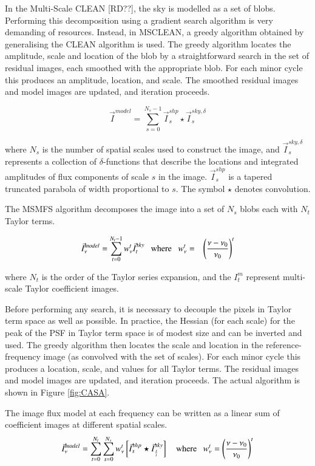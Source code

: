 \documentclass[11pt,a4paper]{article}
\begin{document}
In the Multi-Scale CLEAN [RD??], the sky is modelled as a set of blobs. Performing this decomposition using a gradient search algorithm is very demanding of resources. Instead, in MSCLEAN, a greedy algorithm obtained by generalising the CLEAN algorithm is used. The greedy algorithm locates the amplitude, scale and location of the blob by a straightforward search in the set of residual images, each smoothed with the appropriate blob. For each minor cycle this produces an amplitude, location, and scale. The smoothed residual images and model images are updated, and iteration proceeds.

\begin{equation}
\vec{I}^{model} = \sum_{s=0}^{N_s-1}  \vec{I}^{shp}_{s} \star \vec{I}^{sky,\delta}_s
\label{Eq:ms_model}
\end{equation}

where $N_s$ is the number of spatial scales used to construct the image, and
$\vec{I}^{sky,\delta}_{s}$ represents a collection of $\delta$-functions that describe the locations
and integrated amplitudes of flux components of scale $s$ in the image. $\vec{I}^{shp}_s$ is a tapered truncated parabola of width proportional to $s$.
The symbol $\star$ denotes convolution. 

The MSMFS algorithm decomposes the image into a set of $N_s$ blobs each with $N_t$ Taylor terms. 

\begin{eqnarray}
\label{eqn:mf_model}
\vec{I}^{model}_{\nu} = \sum_{t=0}^{N_t-1} {w_{\nu}^t} \vec{I}^{sky}_{t} ~~~\mathrm{where}~~~ {w_{\nu}^t}&=&{\left(\frac{\nu-\nu_0}{\nu_0}\right)}^t 
\end{eqnarray}

where $N_t$ is the order of the Taylor series expansion, and 
the $I^m_t$ represent multi-scale Taylor coefficient images.

Before performing any search, it is necessary to decouple the pixels in Taylor term space as well as possible. In practice, the Hessian (for each scale) for the peak of the PSF in Taylor term space is of modest size and can be inverted and used. The greedy algorithm then locates the scale and location in the reference-frequency image (as convolved with the set of scales). For each minor cycle this produces a location, scale, and values for all Taylor terms. The residual images and model images are updated, and iteration proceeds. The actual algorithm is shown in Figure \ref{fig:CASA}.


The image flux model at each frequency can be written as a linear sum of  
coefficient images at different spatial scales. 
\begin{equation}
\vec{I}^{model}_{\nu} = \sum_{t=0}^{N_t} \sum_{s=0}^{N_s} {w_{\nu}^t} \left[ \vec{I}^{shp}_s \star \vec{I}^{sky}_\frac{s}{t}\right] ~~~~\mathrm{where}~~~{w_{\nu}^t} = {\left(\frac{\nu-\nu_0}{\nu_0}\right)}^t 
\label{eqn:msmf_model}
\end{equation}
\end{document}
